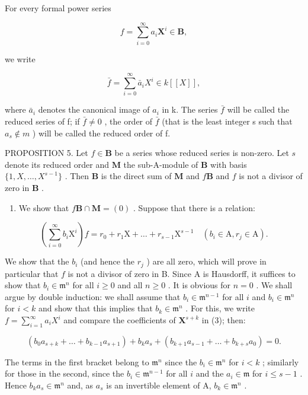 For every formal power series

\[
f = \sum_ {i = 0} ^ {\infty} a _ {i} \mathbf {X} ^ {i} \in \mathbf {B},
\]

we write

\[
\bar {f} = \sum_ {i = 0} ^ {\infty} \bar {a} _ {i} X ^ {i} \in k [ [ X ] ],
\]

where \(\bar{a}_{i}\) denotes the canonical image of \(a_{i}\) in k. The series \(\bar{f}\) will be called the reduced series of f; if \(\bar{f} \neq 0\) , the order of \(\bar{f}\) (that is the least integer s such that \(a_{s} \notin m\) ) will be called the reduced order of f.

PROPOSITION 5. Let \(f \in \mathbf{B}\) be a series whose reduced series is non-zero. Let \(s\) denote its reduced order and \(\mathbf{M}\) the sub-A-module of \(\mathbf{B}\) with basis \(\{1, X, \ldots, X^{s-1}\}\) . Then \(\mathbf{B}\) is the direct sum of \(\mathbf{M}\) and \(f\mathbf{B}\) and \(f\) is not a divisor of zero in \(\mathbf{B}\) .

\begin{enumerate}
\def\labelenumi{(\alph{enumi})}
\tightlist
\item
  We show that \(f\mathbf{B} \cap \mathbf{M} = (0)\) . Suppose that there is a relation:
\end{enumerate}

\[
\left(\sum_ {i = 0} ^ {\infty} b _ {i} \mathrm{X} ^ {i}\right) f = r _ {0} + r _ {1} \mathrm{X} + \dots + r _ {s - 1} \mathrm{X} ^ {s - 1} \quad (b _ {i} \in \mathrm{A}, r _ {j} \in \mathrm{A}).\tag{3}
\]

We show that the \(b_{i}\) (and hence the \(r_{j}\) ) are all zero, which will prove in particular that \(f\) is not a divisor of zero in B. Since A is Hausdorff, it suffices to show that \(b_{i} \in \mathfrak{m}^{n}\) for all \(i \geqslant 0\) and all \(n \geqslant 0\) . It is obvious for \(n = 0\) . We shall argue by double induction: we shall assume that \(b_{i} \in \mathfrak{m}^{n-1}\) for all \(i\) and \(b_{i} \in \mathfrak{m}^{n}\) for \(i < k\) and show that this implies that \(b_{k} \in \mathfrak{m}^{n}\) . For this, we write \(f = \sum_{i=1}^{\infty} a_{i} X^{i}\) and compare the coefficients of \(\mathbf{X}^{s+k}\) in (3); then:

\[
\left(b _ {0} a _ {s + k} + \dots + b _ {k - 1} a _ {s + 1}\right) + b _ {k} a _ {s} + \left(b _ {k + 1} a _ {s - 1} + \dots + b _ {k + s} a _ {0}\right) = 0.\tag{4}
\]

The terms in the first bracket belong to \(\mathfrak{m}^n\) since the \(b_i \in \mathfrak{m}^n\) for \(i < k\) ; similarly for those in the second, since the \(b_i \in \mathfrak{m}^{n-1}\) for all \(i\) and the \(a_i \in \mathfrak{m}\) for \(i \leqslant s - 1\) . Hence \(b_k a_s \in \mathfrak{m}^n\) and, as \(a_s\) is an invertible element of A, \(b_k \in \mathfrak{m}^n\) .

